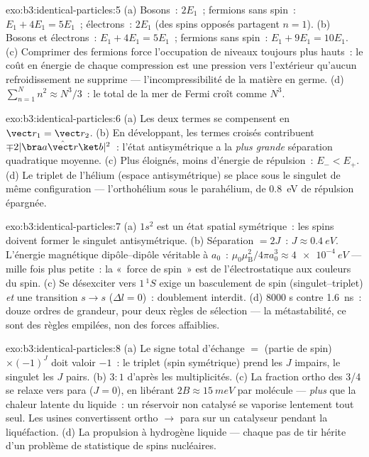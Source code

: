 \begin{solution}{exo:b3:identical-particles:5}
(a) Bosons~: $2E_1$~; fermions sans spin~: $E_1 + 4E_1 = 5E_1$~;
électrons~: $2E_1$ (des spins opposés partagent $n = 1$). (b) Bosons
et électrons~: $E_1 + 4E_1 = 5E_1$~; fermions sans spin~: $E_1 + 9E_1 =
10E_1$. (c) Comprimer des fermions force l'occupation de niveaux
toujours plus hauts~: le coût en énergie de chaque compression est une
pression vers l'extérieur qu'aucun refroidissement ne supprime ---
l'incompressibilité de la matière en germe. (d)
$\sum_{n=1}^N n^2 \approx N^3/3$~: le total de la mer de Fermi croît
comme $N^3$.
\end{solution}

\begin{solution}{exo:b3:identical-particles:6}
(a) Les deux termes se compensent en $\vect r_1 = \vect r_2$. (b) En
développant, les termes croisés contribuent
$\mp2|\bra a\hat{\vect r}\ket b|^2$~: l'état antisymétrique a la
\emph{plus grande} séparation quadratique moyenne. (c) Plus éloignés,
moins d'énergie de répulsion~: $E_- <
E_+$. (d) Le triplet de l'hélium (espace antisymétrique) se place sous
le singulet de même configuration --- l'orthohélium sous le
parahélium, de \qty{0.8}{eV} de répulsion épargnée.
\end{solution}

\begin{solution}{exo:b3:identical-particles:7}
(a) $1s^2$ est un état spatial symétrique~: les spins doivent former
le singulet antisymétrique. (b) Séparation $= 2J$~: $J \approx
\qty{0.4}{eV}$. L'énergie magnétique dipôle--dipôle véritable à
$a_0$~: $\mu_0\mu_{\text{B}}^2/4\pi a_0^3 \approx \qty{4e-4}{eV}$
--- mille fois plus petite~: la «~force de spin~» est de
l'électrostatique aux couleurs du spin. (c) Se désexciter vers
$1\,^1S$ exige un basculement de spin (singulet--triplet) \emph{et}
une transition $s \to s$ ($\Delta l =
0$)~: doublement interdit. (d) $8000$ s contre \qty{1.6}{ns}~: douze
ordres de grandeur, pour deux règles de sélection --- la
métastabilité, ce sont des règles empilées, non des forces affaiblies.
\end{solution}

\begin{solution}{exo:b3:identical-particles:8}
(a) Le signe total d'échange $=$ (partie de spin) $\times (-1)^J$ doit
valoir $-1$~: le triplet (spin symétrique) prend les $J$ impairs, le
singulet les $J$ pairs. (b) $3:1$ d'après les multiplicités. (c) La
fraction ortho des 3/4 se relaxe vers para ($J = 0$), en libérant
$2B \approx \qty{15}{meV}$ par molécule --- \emph{plus} que la chaleur
latente du liquide~: un réservoir non catalysé se vaporise lentement
tout seul. Les usines convertissent ortho $\to$ para sur un
catalyseur pendant la liquéfaction. (d) La propulsion à hydrogène
liquide --- chaque pas de tir hérite d'un problème de statistique de
spins nucléaires.
\end{solution}

